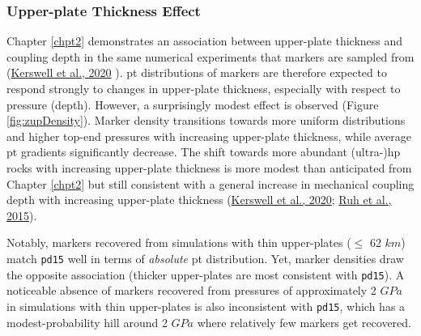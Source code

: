 \hypertarget{upper-plate-thickness-effect}{%
\subsubsection{Upper-plate Thickness Effect}\label{upper-plate-thickness-effect}}

Chapter \ref{chpt2} demonstrates an association between upper-plate thickness and coupling depth in the same numerical experiments that markers are sampled from (\protect\hyperlink{ref-kerswell2020}{Kerswell et al., 2020} ). \gls{pt} distributions of markers are therefore expected to respond strongly to changes in upper-plate thickness, especially with respect to pressure (depth). However, a surprisingly modest effect is observed (Figure \ref{fig:zupDensity}). Marker density transitions towards more uniform distributions and higher top-end pressures with increasing upper-plate thickness, while average \gls{pt} gradients significantly decrease. The shift towards more abundant (ultra-)\gls{hp} rocks with increasing upper-plate thickness is more modest than anticipated from Chapter \ref{chpt2} but still consistent with a general increase in mechanical coupling depth with increasing upper-plate thickness (\protect\hyperlink{ref-kerswell2020}{Kerswell et al., 2020}; \protect\hyperlink{ref-ruh2015}{Ruh et al., 2015}).

Notably, markers recovered from simulations with thin upper-plates (\(\leq\) 62 \(km\)) match \texttt{pd15} well in terms of \emph{absolute} \gls{pt} distribution. Yet, marker densities draw the opposite association (thicker upper-plates are most consistent with \texttt{pd15}). A noticeable absence of markers recovered from pressures of approximately 2 \(GPa\) in simulations with thin upper-plates is also inconsistent with \texttt{pd15}, which has a modest-probability hill around 2 \(GPa\) where relatively few markers get recovered.



